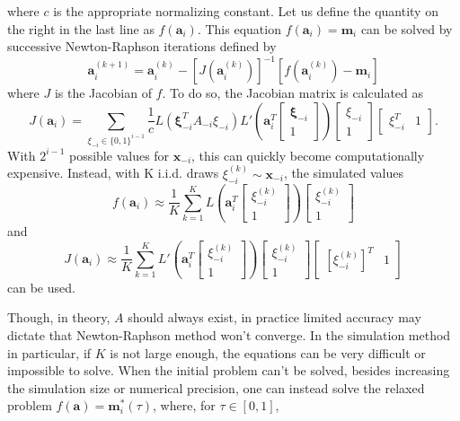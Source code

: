 \documentclass[11pt]{article}
\theoremstyle{definition}
\begin{document}
            where $c$ is the appropriate normalizing constant. Let us define the quantity on the right in the last line as $f(\mathbf a_i)$. This equation $f(\mathbf a_i)=\mathbf{m}_i$ can be solved by successive Newton-Raphson iterations defined by 
            \[\mathbf a_i^{(k+1)} = \mathbf a_i^{(k)} - \left[J\left(\mathbf a_i^{(k)}\right) \right]^{-1}\left[f\left(\mathbf a_i^{(k)}\right)-\mathbf m_i\right] \]
            where $J$ is the Jacobian of $f$. To do so, the Jacobian matrix is calculated as 
        \[ J\left( \mathbf a_i\right) = \sum_{\xi_{-i} \in \{0,1\}^{i-1}} \frac{1}{c}L\left(\mathbf \xi_{-i}^TA_{-i}\xi_{-i}\right) L'\left(\mathbf{a}_i^T\left[\begin{array}{c} \mathbf \xi_{-i} \\ 1 \end{array}\right]\right)\left[\begin{array}{c} \xi_{-i} \\ 1 \end{array}\right]\left[\begin{array}{cc} \xi_{-i}^T & 1 \end{array}\right]. \]
            With $2^{i-1}$ possible values for $\mathbf x_{-i}$, this can quickly become computationally expensive. Instead, with K i.i.d. draws $\xi_{-i}^{(k)}\sim \mathbf x_{-i}$, the simulated values 
            \[f\left(\mathbf a_i\right) \approx \frac{1}{K}\sum_{k=1}^K L\left(\mathbf{a}_i^T\left[\begin{array}{c} \xi_{-i}^{(k)} \\ 1 \end{array}\right]\right)\left[\begin{array}{c} \xi_{-i}^{(k)} \\ 1 \end{array}\right] \]
            and
            \[J\left( \mathbf a_i\right) \approx \frac{1}{K}\sum_{k=1}^K L'\left(\mathbf{a}_i^T\left[\begin{array}{c} \xi_{-i}^{(k)} \\ 1 \end{array}\right]\right)\left[\begin{array}{c} \xi_{-i}^{(k)} \\ 1 \end{array}\right]\left[\begin{array}{cc} [\xi_{-i}^{(k)}]^T & 1 \end{array}\right] \]
            can be used. \par
            Though, in theory, $A$ should always exist, in practice limited accuracy may dictate that Newton-Raphson method won't converge. In the simulation method in particular, if $K$ is not large enough, the equations can be very difficult or impossible to solve. When the initial problem can't be solved, besides increasing the simulation size or numerical precision, one can instead solve the relaxed problem  $f(\mathbf a)=\mathbf m_i^*(\tau)$, where, for $\tau\in[0,1]$,
\end{document}
